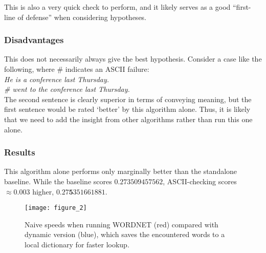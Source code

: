 \documentclass{article}
\begin{document}
This is also a very quick check to perform, and it likely serves as a good ``first-line of defense'' when considering hypotheses.

\subsubsection{Disadvantages}
This does not necessarily always give the best hypothesis. Consider a case like the following, where \# indicates an ASCII failure: \\


\textit{He is a conference last Thursday.} \\

\textit{\# went to the conference last Thursday.} \\

The second sentence is clearly superior in terms of conveying meaning, but the first sentence would be rated `better' by this algorithm alone. Thus, it is likely that we need to add the insight from other algorithms rather than run this one alone.

\subsubsection{Results}
This algorithm alone performs only marginally better than the standalone baseline. While the baseline scores $0.273509457562$, ASCII-checking scores $\approx0.003$ higher, $0.27\textbf{5}351661881$.

\begin{figure}[ht]
\caption{Naive speeds when running WORDNET (red) compared with dynamic version (blue), which saves the encountered words to a local dictionary for faster lookup.}
\label{fig:dynamic}
\centering
\texttt{[image: figure\_2]}
\end{figure}
\end{document}
